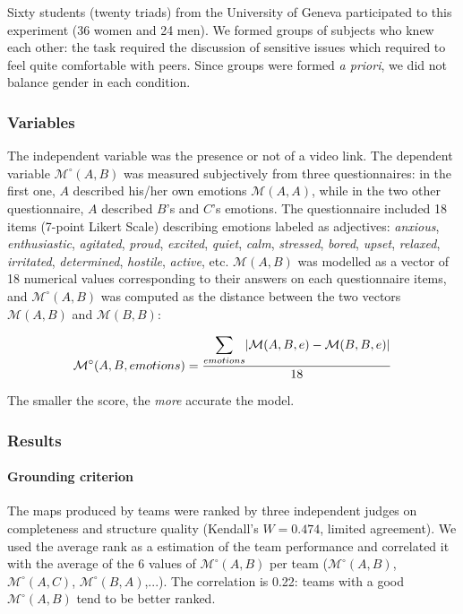 \documentclass[natbib]{svjour3}
\newcommand{\M}[3]{{\mathcal{M}(#1, #2, #3)}}
\newcommand{\gmodel}[2]{{$\mathcal{M}(#1, #2)$}}
\newcommand{\gModel}[2]{{$\mathcal{M}^{\circ}(#1, #2)$}}
\newcommand{\Mdeg}[3]{{\mathcal{M}^{\circ}(#1, #2, #3)}}
\DeclarePairedDelimiter\abs{\lvert}{\rvert}%
\begin{document}
Sixty students (twenty triads) from the University of Geneva participated to
this experiment (36 women and 24 men). We formed groups of subjects who knew
each other: the task required the discussion of sensitive issues which required
to feel quite comfortable with peers. Since groups were formed \textit{a
priori}, we did not balance gender in each condition.

\subsubsection*{Variables}

The independent variable was the presence or not of a video link. The dependent
variable \gModel{A}{B} was measured subjectively from three questionnaires: in
the first one, $A$ described his/her own emotions \gmodel{A}{A}, while in the
two other questionnaire, $A$ described $B$'s and $C$'s emotions. The questionnaire
included 18 items (7-point Likert Scale) describing emotions labeled as
adjectives: \emph{anxious}, \emph{enthusiastic}, \emph{agitated}, \emph{proud},
\emph{excited}, \emph{quiet}, \emph{calm}, \emph{stressed}, \emph{bored},
\emph{upset}, \emph{relaxed}, \emph{irritated}, \emph{determined},
\emph{hostile}, \emph{active}, etc. \gmodel{A}{B} was modelled as a vector of 18
numerical values corresponding to their answers on each questionnaire items, and
\gModel{A}{B} was computed as the distance between the two vectors
\gmodel{A}{B} and \gmodel{B}{B}:

\[
    \Mdeg{A}{B}{emotions} = \frac{\displaystyle\sum_{emotions} \abs{\M{A}{B}{e} -
    \M{B}{B}{e}}}{18}
\]

The smaller the score, the \emph{more} accurate the model.

\subsubsection*{Results}

\paragraph{Grounding criterion} The maps produced by teams were ranked by three
independent judges on completeness and structure quality (Kendall's $W=0.474$,
limited agreement). We used the average rank as a estimation of the team
performance and correlated it with the average of the 6 values of \gModel{A}{B}
per team (\gModel{A}{B}, \gModel{A}{C}, \gModel{B}{A},...). The correlation is
0.22: teams with a good \gModel{A}{B} tend to be better ranked. 
\end{document}
